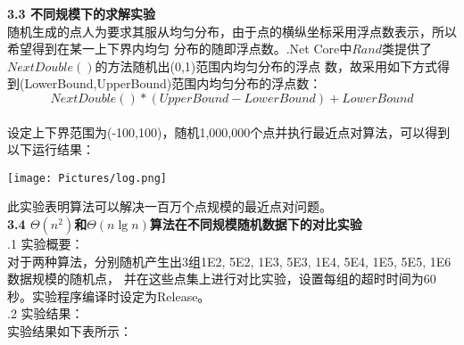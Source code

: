\documentclass[a4paper]{article}
\begin{document}
\begin{enumerate}
  \medskip
  \textbf{3.3 不同规模下的求解实验}\\
  \medskip
  随机生成的点人为要求其服从均匀分布，由于点的横纵坐标采用浮点数表示，所以希望得到在某一上下界内均匀
  分布的随即浮点数。.Net Core中$Rand$类提供了$NextDouble()$的方法随机出(0,1)范围内均匀分布的浮点
  数，故采用如下方式得到(LowerBound,UpperBound)范围内均匀分布的浮点数：
  $$NextDouble()*(UpperBound-LowerBound)+LowerBound$$\\
  设定上下界范围为(-100,100)，随机1,000,000个点并执行最近点对算法，可以得到以下运行结果：
  \bigskip
  \begin{center}
    \texttt{[image: Pictures/log.png]}
  \end{center}
  此实验表明算法可以解决一百万个点规模的最近点对问题。\\
  \medskip
  \textbf{3.4 $\Theta(n^2)$和$\Theta(n\lg n)$算法在不同规模随机数据下的对比实验}\\
  .1 实验概要：\\
  对于两种算法，分别随机产生出3组1E2, 5E2, 1E3, 5E3, 1E4, 5E4, 1E5, 5E5, 1E6数据规模的随机点，
  并在这些点集上进行对比实验，设置每组的超时时间为60秒。实验程序编译时设定为Release。\\
  .2 实验结果：\\
  实验结果如下表所示：\\ \medskip
\end{enumerate}
\end{document}
